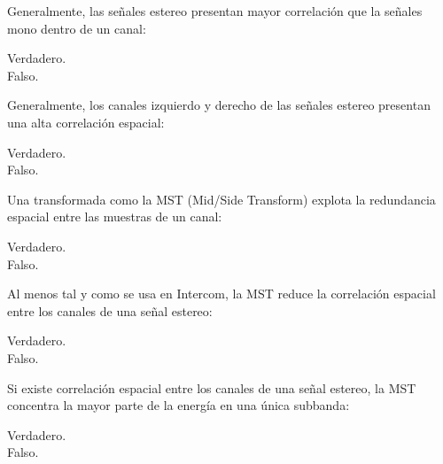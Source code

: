 \documentclass[legalpaper, 12pt, addpoints]{exam}
\begin{document}
\begin{questions}
\vspace{0.10in}

\question Generalmente, las señales estereo presentan mayor
correlación que la señales mono dentro de un canal:

\begin{oneparchoices}
  \choice Verdadero.\\
  \choice Falso.
\end{oneparchoices}
  
\vspace{0.10in}

\question Generalmente, los canales izquierdo y derecho de las señales
estereo presentan una alta correlación espacial:

\begin{oneparchoices}
  \choice Verdadero.\\
  \choice Falso.
\end{oneparchoices}
  
\vspace{0.10in}

\question Una transformada como la MST (Mid/Side Transform) explota la
redundancia espacial entre las muestras de un canal:

\begin{oneparchoices}
  \choice Verdadero.\\
  \choice Falso.
\end{oneparchoices}
  
\vspace{0.10in}

\question Al menos tal y como se usa en Intercom, la MST reduce la
correlación espacial entre los canales de una señal estereo:

\begin{oneparchoices}
  \choice Verdadero.\\
  \choice Falso.
\end{oneparchoices}
  
\vspace{0.10in}

\question Si existe correlación espacial entre los canales de una
señal estereo, la MST concentra la mayor parte de la energía en una
única subbanda:

\begin{oneparchoices}
  \choice Verdadero.\\
  \choice Falso.
\end{oneparchoices}
  
\vspace{0.10in}


\end{questions}
\end{document}
